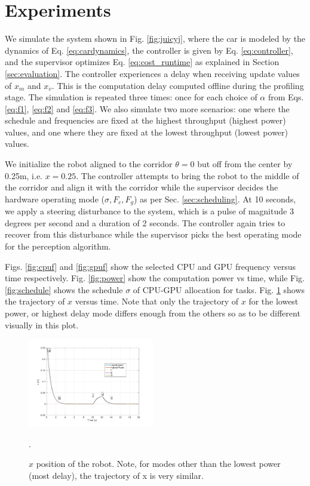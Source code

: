 \section{Experiments}
\label{sec:simResults}

We simulate the system shown in Fig. \ref{fig:juicyj}, where the car is modeled by the dynamics of Eq. \eqref{eq:cardynamics}, the controller is given by Eq. \eqref{eq:controller}, and the supervisor optimizes Eq. \ref{eq:cost_runtime} as explained in Section \ref{sec:evaluation}. 
The controller experiences a delay when receiving update values of $x_m$ and $x_v$. 
This is the computation delay computed offline during the profiling stage. 
The simulation is repeated three times: once for each choice of $\alpha$ from Eqs. \eqref{eq:f1}, \eqref{eq:f2} and \eqref{eq:f3}.
We also simulate two more scenarios: one where the schedule and frequencies are fixed at the highest throughput (highest power) values, and one where they are fixed at the lowest throughput (lowest power) values.

We initialize the robot aligned to the corridor $\theta=0$ but off from the center by 0.25m, i.e. $x=0.25$. 
The controller attempts to bring the robot to the middle of the corridor and align it with the corridor while the supervisor decides the hardware operating mode ($\sigma,F_c,F_g$) as per Sec. \ref{sec:scheduling}. 
At 10 seconds, we apply a steering disturbance to the system, which is a pulse of magnitude 3 degrees per second and a duration of 2 seconds. 
The controller again tries to recover from this disturbance while the supervisor picks the best operating mode for the perception algorithm. 

Figs. \ref{fig:cpuf} and \ref{fig:gpuf} show the selected CPU and GPU frequency versus time respectively. 
Fig. \ref{fig:power} show the computation power vs time, while Fig. \ref{fig:schedule} shows the schedule $\sigma$ of CPU-GPU allocation for tasks.
Fig. \ref{fig:xvst} shows the trajectory of $x$ versus time.  
Note that only the trajectory of $x$ for the lowest power, or highest delay mode differs enough from the others so as to be different visually in this plot.


\begin{figure}[t]
\centering
\includegraphics[width=0.49\textwidth]{../simulations/figs/xvst.pdf}
\vspace{-20pt}
\caption{$x$ position of the robot. Note, for modes other than the lowest power (most delay), the trajectory of x is very similar.}.
\label{fig:xvst} 
\end{figure}

